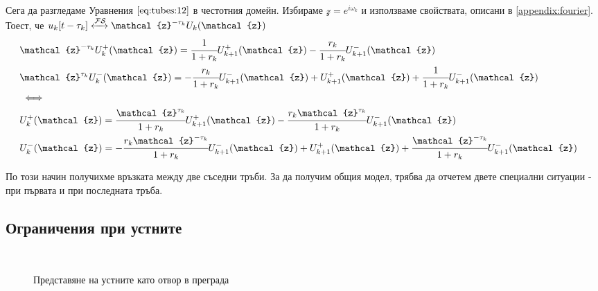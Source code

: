 \documentclass[main.tex]{subfiles}
\begin{document}
Сега да разгледаме Уравнения $\eqref{eq:tubes:12}$ в честотния домейн. Избираме $\mathcal{z} = e^{i\omega_k}$ и използваме свойствата, описани в \autoref{appendix:fourier}. Тоест, че $u_k[t - \tau_k] \xleftrightarrow{\mathcal{F}\mathcal{S}} \mathcal{z}^{-\tau_k}U_k(\mathcal{z})$
\begin{subequations}
    \label{eq:tubes:13}
    \begin{flalign}
        & \nonumber \mathcal{z}^{-\tau_k}U_k^{+}(\mathcal{z}) = \cfrac{1}{1 + r_k} U_{k+1}^{+}(\mathcal{z}) - \cfrac{r_k}{1+r_k} U_{k+1}^{-}(\mathcal{z}) && \\
        & \nonumber \mathcal{z}^{\tau_k} U_k^{-}(\mathcal{z}) = - \cfrac{r_k}{1+r_k} U_{k+1}^{-}(\mathcal{z}) + U_{k+1}^{+}(\mathcal{z}) + \cfrac{1}{1 + r_k} U_{k+1}^{-}(\mathcal{z}) && \\
        & \iff && \\
        & U_k^{+}(\mathcal{z}) = \cfrac{\mathcal{z}^{\tau_k}}{1 + r_k} U_{k+1}^{+}(\mathcal{z}) - \cfrac{r_k\mathcal{z}^{\tau_k}}{1+r_k} U_{k+1}^{-}(\mathcal{z}) && \\
        & U_k^{-}(\mathcal{z}) = - \cfrac{r_k\mathcal{z}^{-\tau_k} }{1+r_k} U_{k+1}^{-}(\mathcal{z}) + U_{k+1}^{+}(\mathcal{z}) + \cfrac{\mathcal{z}^{-\tau_k} }{1 + r_k} U_{k+1}^{-}(\mathcal{z}) &&
    \end{flalign}
\end{subequations}

По този начин получихме връзката между две съседни тръби. За да получим общия модел, трябва да отчетем двете специални ситуации - при първата и при последната тръба.

\subsection{Ограничения при устните}\label{tubes:lips}

 	᠎
 	᠎ 

\begin{center}
\begin{figure}[ht]%
    \centering
    \begin{changemargin}{0cm}{0cm} 
        \hspace{0.2\paperwidth}
    \end{changemargin} 
    \caption{Представяне на устните като отвор в преграда}%
    \label{fig:tubes:3}
\end{figure}
\end{center}
\end{document}
